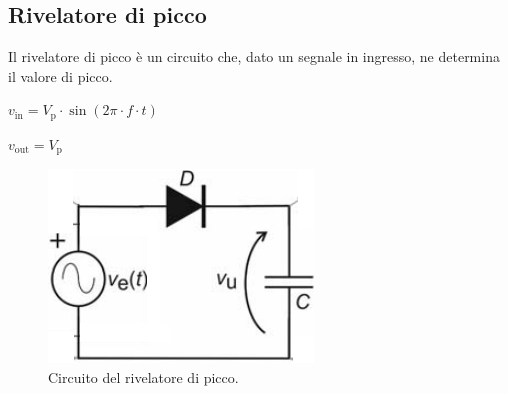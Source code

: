 \documentclass[a4paper]{article}
\begin{document}
		\subsection{Rivelatore di picco}
			Il rivelatore di picco è un circuito che, dato un segnale in ingresso, ne determina il valore di picco.
			\newline
			\begin{center}
				$ v_{\mathrm{in}} = V_{\mathrm{p}} \cdot \sin(2 \pi \cdot f \cdot t) $
			\end{center}
			\newline
			\begin{center}
				$ v_{\mathrm{out}} = V_{\mathrm{p}} $
			\end{center}
			\begin{figure}[h!]
				\centering
				\includegraphics[scale=0.7]{circuitoRivelatoreDiPicco}
				\caption{Circuito del rivelatore di picco.}
				\label{fig:circuitoRivelatoreDiPicco}
			\end{figure}
\end{document}
